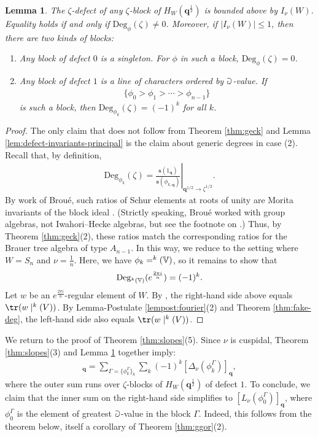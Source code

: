 \documentclass[a4paper,10pt,leqno]{amsart}
\theoremstyle{plain}
\theoremstyle{plain}
\theoremstyle{plain}
\newtheorem{lem}[thm]{Lemma}
\theoremstyle{definition}
\theoremstyle{remark}
\let\Alt\relax
\DeclareMathOperator{\Alt}{\text{$\Lambda$}}
\newcommand{\Q}{\bm{q}}
\newcommand{\UDeg}{\mathrm{Deg}}
\newcommand{\slope}{\nu}
\begin{document}
\begin{lem}\label{lem:defect-invariants}
The $\zeta$-defect of any $\zeta$-block of $H_W(\Q^{\frac{1}{2}})$ is bounded above by $I_\slope(W)$.
Equality holds if and only if $\UDeg_\phi(\zeta) \neq 0$.
Moreover, if $|I_\slope(W)| \leq 1$, then there are two kinds of blocks:
\begin{enumerate}
\item 	Any block of defect $0$ is a singleton.
		For $\phi$ in such a block, $\UDeg_\phi(\zeta) = 0$.
\item 	Any block of defect $1$ is a line of characters ordered by $\mathbb{a}$-value.
		If
		\begin{align}
		\{\phi_0 > \phi_1 > \cdots > \phi_{n - 1}\}
		\end{align}
		is such a block, then $\UDeg_{\phi_k}(\zeta) = (-1)^k$ 	for all $k$.
\end{enumerate}
\end{lem}

\begin{proof}
The only claim that does not follow from Theorem \ref{thm:geck} and Lemma \ref{lem:defect-invariants-principal} is the claim about generic degrees in case (2).
Recall that, by definition, 
\begin{align}
\UDeg_{\phi_k}(\zeta) 
=
	\left.\frac{\bm{s}(1_{\Q})}{\bm{s}(\phi_{k, \Q})}\right|_{\Q^{1/2} \to \zeta^{1/2}}.
\end{align}
By work of Brou\'e, such ratios of Schur elements at roots of unity are Morita invariants of the block ideal \cite[\S{3.7}]{broue}.
(Strictly speaking, Brou\'e worked with group algebras, not Iwahori--Hecke algebras, but see the footnote on \cite[286]{cm}.)
Thus, by Theorem \ref{thm:geck}(2), these ratios match the corresponding ratios for the Brauer tree algebra of type $A_{n - 1}$.
In this way, we reduce to the setting where $W = S_n$ and $\slope = \frac{1}{n}$.
Here, we have $\phi_k = \Alt^k(\bb{V})$, so it remains to show that 
\begin{align}
\UDeg_{\Alt^k(\bb{V})}(e^{\frac{2\pi i}{n}}) = (-1)^k.
\end{align}
Let $w$ be an $e^{\frac{2\pi i}{n}}$-regular element of $W$.
By \cite[Rem.\ 3.7]{jones}, the right-hand side above equals $\tr(w \mid \Alt^k(V))$.
By Lemma-Postulate \ref{lempost:fourier}(2) and Theorem \ref{thm:fake-deg}, the left-hand side also equals $\tr(w \mid \Alt^k(V))$.
\end{proof}

We return to the proof of Theorem \ref{thm:slopes}(5).
Since $\slope$ is cuspidal, Theorem \ref{thm:slopes}(3) and Lemma \ref{lem:defect-invariants} together imply:
\begin{align}
[\Omega_\slope]_{\Q} 
=
	\sum_{\Gamma = \{\phi_k^\Gamma\}_k} 
	\sum_k
	(-1)^k
	[\Delta_\slope(\phi_k^\Gamma)]_{\Q},
\end{align}
where the outer sum runs over $\zeta$-blocks of $H_W(\Q^{\frac{1}{2}})$ of defect $1$.
To conclude, we claim that the inner sum on the right-hand side simplifies to $[L_\slope(\phi_0^\Gamma)]_{\Q}$, where $\phi_0^\Gamma$ is the element of greatest $\mathbb{a}$-value in the block $\Gamma$.
Indeed, this follows from the theorem below, itself a corollary of Theorem \ref{thm:ggor}(2).
\end{document}
